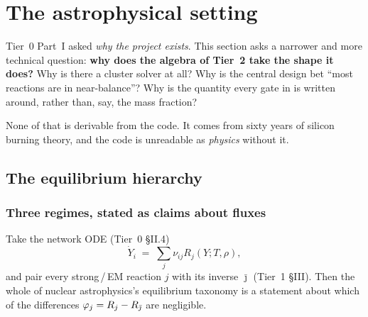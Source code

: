 %

\section{The astrophysical setting}
\label{part:setting}

Tier~0 Part~I asked \emph{why the project exists}. This section asks a narrower
and more technical question: \textbf{why does the algebra of Tier~2 take the
shape it does?} Why is there a cluster solver at all? Why is the central design
bet ``most reactions are in near-balance''? Why is \Ye{} the quantity every gate
in  is written around, rather than, say, the  mass
fraction?

None of that is derivable from the code. It comes from sixty years of silicon
burning theory, and the code is unreadable as \emph{physics} without it.

\subsection{The equilibrium hierarchy}
\label{sec:hierarchy}

\subsubsection{Three regimes, stated as claims about fluxes}
\label{sec:regimes}

Take the network ODE (Tier~0 \S II.4)
%
\begin{equation}
\dot Y_i \;=\; \sum_j \nu_{ij} R_j(Y; T, \rho),
\label{eq:networkode}
\end{equation}
%
and pair every strong\,/\,EM reaction $j$ with its inverse $\bar\jmath$
(Tier~1 \S III). Then the whole of nuclear astrophysics's equilibrium taxonomy
is a statement about which of the differences $\varphi_j = R_j - R_{\bar\jmath}$
are negligible.

